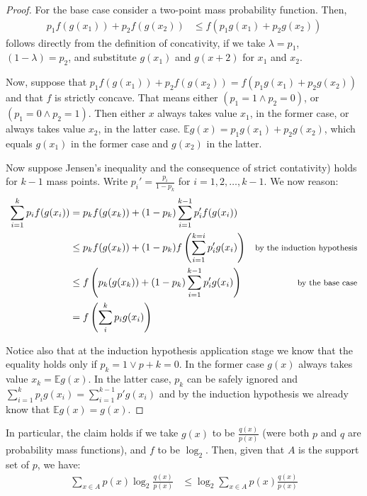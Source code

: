\documentclass[
  10pt,
  dvipsnames,enabledeprecatedfontcommands]{scrartcl}
\begin{document}
\begin{proof}
For the base case consider a two-point mass probability function. Then,
\begin{align*}
p_1f(g(x_1))+ p_2f(g(x_2)) &\leq f(p_1g(x_1) + p_2g(x_2))
\end{align*}
\noindent follows directly from the definition of concativity, if we take $\lambda = p_1$, $(1-\lambda)=p_2$,
 and substitute $g(x_1)$ and $g(x+2)$ for $x_1$ and $x_2$.



Now, suppose that  $ p_1f(g(x_1))+ p_2f(g(x_2)) = f(p_1g(x_1) + p_2g(x_2))$ and that   $f$ is strictly concave.
 That means either $(p_1 = 1\wedge p_2 = 0)$, or $(p_1 = 0 \wedge p_2 =1)$. Then either $x$ always takes
  value $x_1$, in the former case, or always takes value $x_2$, in the latter
   case. $\mathbb{E} g (x) =  p_1 g(x_1) + p_2 g(x_2)$, which equals  $g(x_1)$ in the former case and $g(x_2)$ in the latter.


Now suppose Jensen's inequality and the consequence of strict contativity) holds for $k-1$ mass points. 
Write $p_i' = \frac{p_i}{1-p_k}$ for $i = 1, 2, \dots, k-1$. We now reason:
\begin{align*}
\sum_{i=1}^k p_i f(g(x_i)) & =
 p_kf(g(x_k)) + (1-p_k)\sum_{i =1}^{k-1}p_i'f(g(x_i)) &\\
 & \leq p_k f(g(x_k)) + (1-p_k)f\left( \sum_{i = 1}^{k=i}p_i' g(x_i) \right) & \mbox{\footnotesize by 
 the induction hypothesis}\\ &\leq f\left( p_k(g(x_k)) + (1-p_k)\sum_{i = 1}^{k-1} p_i' g(x_i)\right) & 
 \mbox{\footnotesize by the base case} \\
 & = f \left( \sum_{i}^k p_i g(x_i)\right)
 \end{align*}

Notice also that at the induction hypothesis application stage we know that the equality holds only if 
$p_k =1 \vee p+k = 0$. In the former case $g(x)$ always takes value $x_k = \mathbb{E} g(x)$. In the latter case,
 $p_k$ can be safely ignored and $\sum_{i=1}^{k}p_ig(x_i) = \sum_{i=1}^{k-1}p'g(x_i)$ and by the induction 
 hypothesis we already know that $\mathbb{E} g(x) = g(x)$.


\end{proof}

In particular, the claim holds if we take \(g(x)\) to be
\(\frac{q(x)}{p(x)}\) (were both \(p\) and \(q\) are probability mass
functions), and \(f\) to be \(\log_2\). Then, given that \(A\) is the
support set of \(p\), we have: \begin{align*}
\sum_{x\in A}p(x) \log_2 \frac{q(x)}{p(x)} & \leq \log_2 \sum_{x\in A}p(x)\frac{q(x)}{p(x)}
\end{align*}
\end{document}
